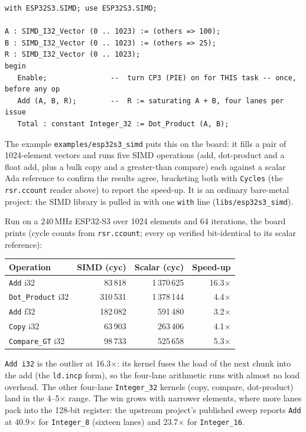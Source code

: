 \begin{lstlisting}
with ESP32S3.SIMD; use ESP32S3.SIMD;

A : SIMD_I32_Vector (0 .. 1023) := (others => 100);
B : SIMD_I32_Vector (0 .. 1023) := (others => 25);
R : SIMD_I32_Vector (0 .. 1023);
begin
   Enable;               --  turn CP3 (PIE) on for THIS task -- once, before any op
   Add (A, B, R);        --  R := saturating A + B, four lanes per issue
   Total : constant Integer_32 := Dot_Product (A, B);
\end{lstlisting}

The example \texttt{examples/esp32s3\_simd} puts this on the board: it fills a pair of
1024-element vectors and runs five SIMD operations (add, dot-product and a float
add, plus a bulk copy and a greater-than compare) each against a scalar Ada
reference to confirm the results agree, bracketing both with \texttt{Cycles} (the
\texttt{rsr.ccount} reader above) to report the speed-up. It is an ordinary
bare-metal project: the SIMD library is pulled in with one \texttt{with} line
(\texttt{libs/esp32s3\_simd}).

Run on a 240\,MHz ESP32-S3 over 1024 elements and 64 iterations, the board prints
(cycle counts from \texttt{rsr.ccount}; every op verified bit-identical to its scalar
reference):

\begin{center}
\begin{tabular}{l r r r}
\toprule
\textbf{Operation} & \textbf{SIMD (cyc)} & \textbf{Scalar (cyc)} & \textbf{Speed-up} \\ \midrule
\texttt{Add} i32          &  83\,818 & 1\,370\,625 & 16.3$\times$ \\
\texttt{Dot\_Product} i32 & 310\,531 & 1\,378\,144 &  4.4$\times$ \\
\texttt{Add} f32          & 182\,082 &   591\,480  &  3.2$\times$ \\
\texttt{Copy} i32         &  63\,903 &   263\,406  &  4.1$\times$ \\
\texttt{Compare\_GT} i32  &  98\,733 &   525\,658  &  5.3$\times$ \\
\bottomrule
\end{tabular}
\end{center}

\texttt{Add i32} is the outlier at 16.3$\times$: its kernel fuses the load of the
next chunk into the add (the \texttt{ld.incp} form), so the four-lane arithmetic runs
with almost no load overhead. The other four-lane \texttt{Integer\_32} kernels
(copy, compare, dot-product) land in the 4--5$\times$ range. The win grows with
narrower elements, where more lanes pack into the 128-bit register: the upstream
project's published sweep reports \texttt{Add} at 40.9$\times$ for \texttt{Integer\_8}
(sixteen lanes) and 23.7$\times$ for \texttt{Integer\_16}.

